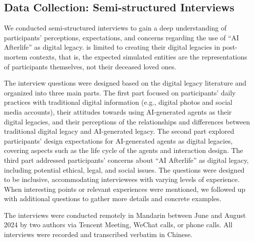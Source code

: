\subsection{Data Collection: Semi-structured Interviews}
We conducted semi-structured interviews to gain a deep understanding of participants' perceptions, expectations, and concerns regarding the use of ``AI Afterlife'' as digital legacy. 
 is limited to creating their digital legacies in post-mortem contexts, that is, the expected simulated entities are the representations of participants themselves, not their deceased loved ones.

The interview questions were designed based on the digital legacy literature \cite{doyle2023digital, morris2024generative} and organized into three main parts. The first part focused on participants' daily practices with traditional digital information (e.g., digital photos and social media accounts), their attitudes towards using AI-generated agents as their digital legacies, and their perceptions of the relationships and differences between traditional digital legacy and AI-generated legacy. The second part explored participants' design expectations for AI-generated agents as digital legacies, covering aspects such as the life cycle of the agents and interaction design. The third part addressed participants' concerns about ``AI Afterlife'' as digital legacy, including potential ethical, legal, and social issues. 
The questions were designed to be inclusive, accommodating interviewees with varying levels of experience. When interesting points or relevant experiences were mentioned, we followed up with additional questions to gather more details and concrete examples.

The interviews were conducted remotely in Mandarin between June and August 2024 by two authors via Tencent Meeting, WeChat calls, or phone calls.  All interviews were recorded and transcribed verbatim in Chinese. 

